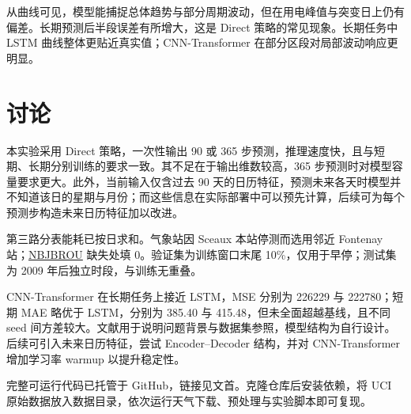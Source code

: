 \documentclass[UTF8,a4paper,12pt]{ctexart}
\newcommand{\varname}[1]{\url{#1}}
\begin{document}
从曲线可见，模型能捕捉总体趋势与部分周期波动，但在用电峰值与突变日上仍有偏差。长期预测后半段误差有所增大，这是 Direct 策略的常见现象。长期任务中 LSTM 曲线整体更贴近真实值；CNN-Transformer 在部分区段对局部波动响应更明显。

\section{讨论}

本实验采用 Direct 策略，一次性输出 90 或 365 步预测，推理速度快，且与短期、长期分别训练的要求一致。其不足在于输出维数较高，365 步预测时对模型容量要求更大。此外，当前输入仅含过去 90 天的日历特征，预测未来各天时模型并不知道该日的星期与月份；而这些信息在实际部署中可以预先计算，后续可为每个预测步构造未来日历特征加以改进。

第三路分表能耗已按日求和。气象站因 Sceaux 本站停测而选用邻近 Fontenay 站；\varname{NBJBROU} 缺失处填 0。验证集为训练窗口末尾 10\%，仅用于早停；测试集为 2009 年后独立时段，与训练无重叠。

CNN-Transformer 在长期任务上接近 LSTM，MSE 分别为 226229 与 222780；短期 MAE 略优于 LSTM，分别为 385.40 与 415.48，但未全面超越基线，且不同 seed 间方差较大。文献\cite{zeng2023,kleeberg2021}用于说明问题背景与数据集参照，模型结构为自行设计。后续可引入未来日历特征，尝试 Encoder--Decoder 结构，并对 CNN-Transformer 增加学习率 warmup 以提升稳定性。

完整可运行代码已托管于 GitHub，链接见文首。克隆仓库后安装依赖，将 UCI 原始数据放入数据目录，依次运行天气下载、预处理与实验脚本即可复现。
\end{document}

